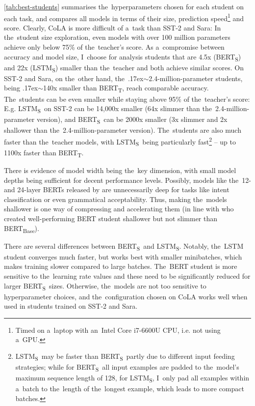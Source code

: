 \documentclass[bsc,frontabs,singlespacing,parskip,deptreport]{infthesis}
\def\mytilde{{\raise.17ex\hbox{$\scriptstyle\sim$}}}
\def\BERTT{BERT\textsubscript{T}}
\def\BERTS{BERT\textsubscript{S}}
\def\LSTMS{LSTM\textsubscript{S}}
\begin{document}
{{\begin{table}[h!bt]
      \label{tab:best-students}
    \end{table}

    \autoref{tab:best-students} summarises the~hyperparameters chosen for each student on each task, and compares all models in terms of their size, prediction speed\footnote{Timed on a~laptop with an~Intel Core i7-6600U CPU, i.e. not using a~GPU.} and score.
    Clearly, CoLA is more difficult of a~task than SST-2 and Sara: In the~student size exploration, even models with over 100 million parameters achieve only below 75\% of the~teacher's score. As a~compromise between accuracy and model size, I~choose for analysis students that are 4.5x (\BERTS) and 22x (\LSTMS) smaller than the~teacher and both achieve similar scores.
    On SST-2 and Sara, on the~other hand, the~\mytilde2.4-million-parameter students, being \mytilde140x smaller than \BERTT, reach comparable accuracy. The~students can be even smaller while staying above 95\% of the~teacher's score: E.g. \LSTMS~on SST-2 can be 14,000x smaller (64x slimmer than the~2.4-million-parameter version), and \BERTS~can be 2000x smaller (3x slimmer and 2x shallower than the~2.4-million-parameter version).
    The~students are also much faster than the~teacher models, with \LSTMS~being particularly fast\footnote{\LSTMS~may be faster than \BERTS~partly due to different input feeding strategies; while for \BERTS~all input examples are padded to the~model's maximum sequence length of 128, for \LSTMS, I~only pad all examples within a~batch to the~length of the~longest example, which leads to more compact batches.} -- up to 1100x faster than \BERTT.
    
    There is evidence of model width being the~key dimension, with small model depths being sufficient for decent performance levels.
    Possibly, models like the~12- and 24-layer BERTs released by \citet{Devlin_2018} are unnecessarily deep for tasks like intent classification or even grammatical acceptability. Thus, making the~models shallower is one way of compressing and accelerating them (in line with \citet{Sanh_2019} who created well-performing BERT student shallower but not slimmer than BERT\textsubscript{Base}).

    There are several differences between \BERTS~and \LSTMS. Notably, the~LSTM student converges much faster, but works best with smaller minibatches, which makes training slower compared to large batches. The~BERT student is more sensitive to the~learning rate values and these need to be significantly reduced for larger \BERTS~sizes.
    Otherwise, the~models are not too sensitive to hyperparameter choices, and the~configuration chosen on CoLA works well when used in students trained on SST-2 and Sara.

}}
\end{document}
